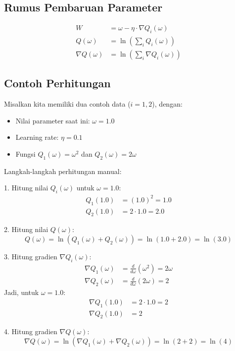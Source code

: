 \subsection*{Rumus Pembaruan Parameter}
\begin{align}
    W & = \omega - \eta \cdot \nabla Q_i(\omega) \\
    Q(\omega) & = \ln\left(\sum_i Q_i(\omega)\right) \\
    \nabla Q(\omega) & = \ln\left(\sum_i \nabla Q_i(\omega)\right)
\end{align}

\subsection*{Contoh Perhitungan}
Misalkan kita memiliki dua contoh data (\( i = 1, 2 \)), dengan:
\begin{itemize}
    \item Nilai parameter saat ini: \( \omega = 1.0 \)
    \item Learning rate: \( \eta = 0.1 \)
    \item Fungsi \( Q_1(\omega) = \omega^2 \) dan \( Q_2(\omega) = 2\omega \)
\end{itemize}

Langkah-langkah perhitungan manual:

1. Hitung nilai \( Q_i(\omega) \) untuk \( \omega = 1.0 \):
   \begin{align*}
       Q_1(1.0) & = (1.0)^2 = 1.0 \\
       Q_2(1.0) & = 2 \cdot 1.0 = 2.0
   \end{align*}

2. Hitung nilai \( Q(\omega) \):
   \[
   Q(\omega) = \ln\left(Q_1(\omega) + Q_2(\omega)\right) = \ln(1.0 + 2.0) = \ln(3.0)
   \]

3. Hitung gradien \( \nabla Q_i(\omega) \):
   \begin{align*}
       \nabla Q_1(\omega) & = \frac{d}{d\omega}(\omega^2) = 2\omega \\
       \nabla Q_2(\omega) & = \frac{d}{d\omega}(2\omega) = 2
   \end{align*}
   Jadi, untuk \( \omega = 1.0 \):
   \begin{align*}
       \nabla Q_1(1.0) & = 2 \cdot 1.0 = 2 \\
       \nabla Q_2(1.0) & = 2
   \end{align*}

4. Hitung gradien \( \nabla Q(\omega) \):
   \[
   \nabla Q(\omega) = \ln\left(\nabla Q_1(\omega) + \nabla Q_2(\omega)\right) = \ln(2 + 2) = \ln(4)
   \]

